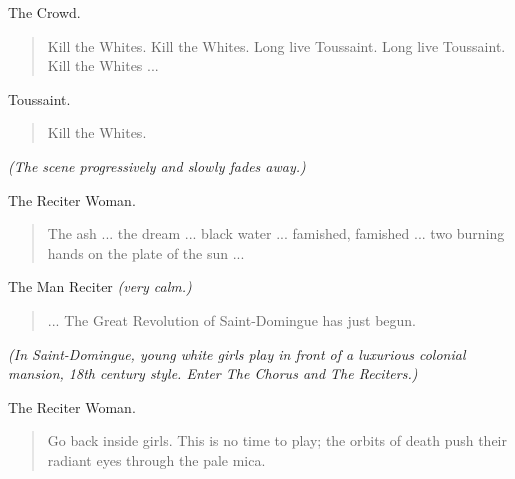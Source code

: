 \documentclass[letterpaper,article,12pt,oneside,notitlepage]{memoir}
\begin{document}
\begin{center}The Crowd.\end{center}

\begin{verse}
\indent Kill the Whites. Kill the Whites. Long live Toussaint. Long live Toussaint. Kill the Whites ... \\
\end{verse}

\begin{center}Toussaint.\end{center}

\begin{verse}
\hspace{1cm} Kill the Whites. \\
\end{verse}

\textit{(The scene progressively and slowly fades away.)}

\begin{center}The Reciter Woman.\end{center}

\begin{verse}
\indent The ash ... the dream ... black water ... famished, famished ... two burning hands on the plate of the sun ... \\
\end{verse}

\begin{center}The Man Reciter \textit{(very calm.)}\end{center}

\begin{verse}
\hspace{1cm} ... The Great Revolution of Saint-Domingue has just begun. \\
\end{verse}

\textit{(In Saint-Domingue, young white girls play in front of a luxurious colonial mansion, 18th century style. Enter The Chorus and The Reciters.)} 

\begin{center}The Reciter Woman.\end{center}

\begin{verse}
\indent Go back inside girls. This is no time to play; the orbits of death push their radiant eyes through the pale mica. \\
\end{verse}
\end{document}
